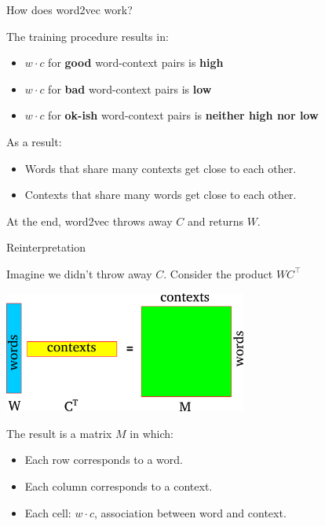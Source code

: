 \documentclass[compress]{beamer}
\begin{document}
\begin{frame}{How does word2vec work?}

    The training procedure results in:
    \begin{itemize}
        \item $w\cdot c$ for \textbf{good} word-context pairs is \textbf{high}
        \item $w\cdot c$ for \textbf{bad} word-context pairs is \textbf{low}
        \item $w\cdot c$ for \textbf{ok-ish} word-context pairs is \textbf{neither high nor low}
    \end{itemize}

    \vspace{1em}
    As a result:
    \begin{itemize}
        \item Words that share many contexts get close to each other.
        \item Contexts that share many words get close to each other.
    \end{itemize}

    \vspace{1em}
    At the end, word2vec throws away $C$ and returns $W$.



\end{frame}

\begin{frame}{Reinterpretation}

    Imagine we didn't throw away $C$. Consider the product $WC^\top$
    \pause
    \vspace{1em}

    \begin{center}
    \includegraphics[width=0.6\textwidth]{distsim/word_context_matrix.png}
    \end{center}

    \vspace{1em}
    The result is a matrix $M$ in which:
    \begin{itemize}
        \item Each row corresponds to a word.
        \item Each column corresponds to a context.
        \item Each cell: $w\cdot c$, association between
            word and context.
    \end{itemize}

\end{frame}
\end{document}
